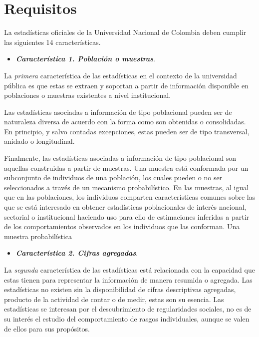 \documentclass[
]{book}
\providecommand{\tightlist}{%
  \setlength{\itemsep}{0pt}\setlength{\parskip}{0pt}}
\begin{document}
\hypertarget{requisitos}{%
\section{Requisitos}\label{requisitos}}

La estadísticas oficiales de la Universidad Nacional de Colombia deben cumplir las siguientes 14 características.

\begin{itemize}
\tightlist
\item
  \textbf{\emph{Característica 1. Población o muestras}}.
\end{itemize}

La \emph{primera} característica de las estadísticas en el contexto de la universidad pública es que estas se extraen y soportan a partir de información disponible en poblaciones o muestras existentes a nivel institucional.

Las estadísticas asociadas a información de tipo poblacional pueden ser de naturaleza diversa de acuerdo con la forma como son obtenidas o consolidadas. En principio, y salvo contadas excepciones, estas pueden ser de tipo transversal, anidado o longitudinal.

Finalmente, las estadísticas asociadas a información de tipo poblacional son aquellas construidas a partir de muestras. Una muestra está conformada por un subconjunto de individuos de una población, los cuales pueden o no ser seleccionados a través de un mecanismo probabilístico. En las muestras, al igual que en las poblaciones, los individuos comparten características comunes sobre las que se está interesado en obtener estadísticas poblacionales de interés nacional, sectorial o institucional haciendo uso para ello de estimaciones inferidas a partir de los comportamientos observados en los individuos que las conforman. Una muestra probabilística

\begin{itemize}
\tightlist
\item
  \textbf{\emph{Característica 2. Cifras agregadas}}.
\end{itemize}

La \emph{segunda} característica de las estadísticas está relacionada con la capacidad que estas tienen para representar la información de manera resumida o agregada. Las estadísticas no existen sin la disponibilidad de cifras descriptivas agregadas, producto de la actividad de contar o de medir, estas son su esencia. Las estadísticas se interesan por el descubrimiento de regularidades sociales, no es de su interés el estudio del comportamiento de rasgos individuales, aunque se valen de ellos para sus propósitos.
\end{document}
